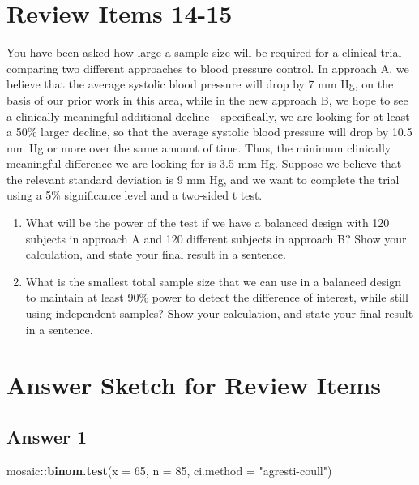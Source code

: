 \documentclass[
]{book}
\newenvironment{Shaded}{\begin{snugshade}}{\end{snugshade}}
\newcommand{\DataTypeTok}[1]{\textcolor[rgb]{0.13,0.29,0.53}{#1}}
\newcommand{\DecValTok}[1]{\textcolor[rgb]{0.00,0.00,0.81}{#1}}
\newcommand{\KeywordTok}[1]{\textcolor[rgb]{0.13,0.29,0.53}{\textbf{#1}}}
\newcommand{\NormalTok}[1]{#1}
\newcommand{\OperatorTok}[1]{\textcolor[rgb]{0.81,0.36,0.00}{\textbf{#1}}}
\newcommand{\StringTok}[1]{\textcolor[rgb]{0.31,0.60,0.02}{#1}}
\providecommand{\tightlist}{%
  \setlength{\itemsep}{0pt}\setlength{\parskip}{0pt}}
\begin{document}
\hypertarget{review-items-14-15}{%
\section{Review Items 14-15}\label{review-items-14-15}}

You have been asked how large a sample size will be required for a clinical trial comparing two different approaches to blood pressure control. In approach A, we believe that the average systolic blood pressure will drop by 7 mm Hg, on the basis of our prior work in this area, while in the new approach B, we hope to see a clinically meaningful additional decline - specifically, we are looking for at least a 50\% larger decline, so that the average systolic blood pressure will drop by 10.5 mm Hg or more over the same amount of time. Thus, the minimum clinically meaningful difference we are looking for is 3.5 mm Hg. Suppose we believe that the relevant standard deviation is 9 mm Hg, and we want to complete the trial using a 5\% significance level and a two-sided t test.

\begin{enumerate}
\def\labelenumi{\arabic{enumi}.}
\setcounter{enumi}{13}
\tightlist
\item
  What will be the power of the test if we have a balanced design with 120 subjects in approach A and 120 different subjects in approach B? Show your calculation, and state your final result in a sentence.
\item
  What is the smallest total sample size that we can use in a balanced design to maintain at least 90\% power to detect the difference of interest, while still using independent samples? Show your calculation, and state your final result in a sentence.
\end{enumerate}

\hypertarget{answer-sketch-for-review-items}{%
\section{Answer Sketch for Review Items}\label{answer-sketch-for-review-items}}

\hypertarget{answer-1}{%
\subsection{Answer 1}\label{answer-1}}

\begin{Shaded}
\begin{Highlighting}[]
\NormalTok{mosaic}\OperatorTok{::}\KeywordTok{binom.test}\NormalTok{(}\DataTypeTok{x =} \DecValTok{65}\NormalTok{, }\DataTypeTok{n =} \DecValTok{85}\NormalTok{, }\DataTypeTok{ci.method =} \StringTok{"agresti-coull"}\NormalTok{)}
\end{Highlighting}
\end{Shaded}
\end{document}
